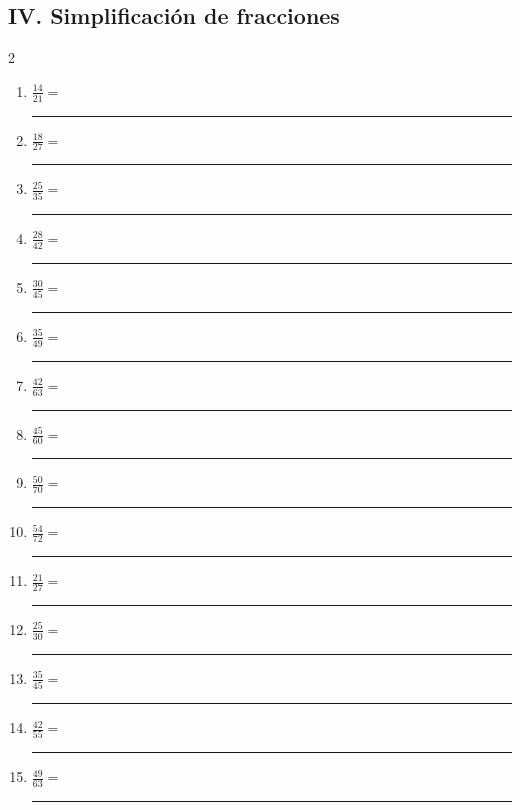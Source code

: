 \documentclass[11pt]{article}
\begin{document}
\subsection*{IV. Simplificación de fracciones}
\begin{multicols}{2}\begin{enumerate}[leftmargin=*,start=51]
\item $\displaystyle \frac{14}{21}=$ \rule{2.0cm}{0.4pt}
\item $\displaystyle \frac{18}{27}=$ \rule{2.0cm}{0.4pt}
\item $\displaystyle \frac{25}{35}=$ \rule{2.0cm}{0.4pt}
\item $\displaystyle \frac{28}{42}=$ \rule{2.0cm}{0.4pt}
\item $\displaystyle \frac{30}{45}=$ \rule{2.0cm}{0.4pt}
\item $\displaystyle \frac{35}{49}=$ \rule{2.0cm}{0.4pt}
\item $\displaystyle \frac{42}{63}=$ \rule{2.0cm}{0.4pt}
\item $\displaystyle \frac{45}{60}=$ \rule{2.0cm}{0.4pt}
\item $\displaystyle \frac{50}{70}=$ \rule{2.0cm}{0.4pt}
\item $\displaystyle \frac{54}{72}=$ \rule{2.0cm}{0.4pt}
\item $\displaystyle \frac{21}{27}=$ \rule{2.0cm}{0.4pt}
\item $\displaystyle \frac{25}{30}=$ \rule{2.0cm}{0.4pt}
\item $\displaystyle \frac{35}{45}=$ \rule{2.0cm}{0.4pt}
\item $\displaystyle \frac{42}{55}=$ \rule{2.0cm}{0.4pt}
\item $\displaystyle \frac{49}{63}=$ \rule{2.0cm}{0.4pt}
\end{enumerate}\end{multicols}
\end{document}
